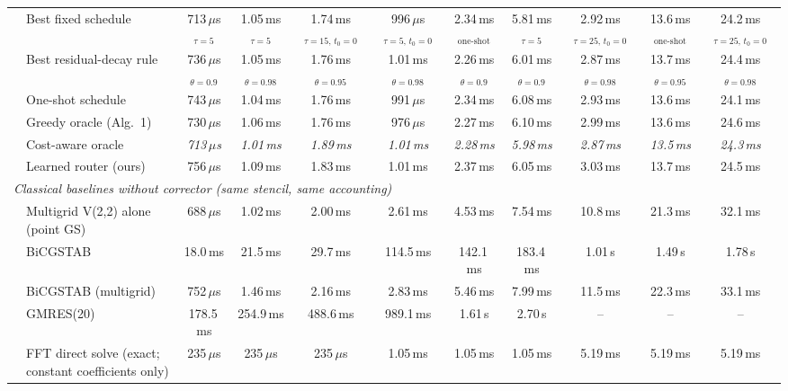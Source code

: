 {\begin{tabular}{llccccccccc}
 & Best fixed schedule & 713\,$\mu$s$_{\tau{=}5}$ & 1.05\,ms$_{\tau{=}5}$ & 1.74\,ms$_{\tau{=}15,\,t_0{=}0}$ & 996\,$\mu$s$_{\tau{=}5,\,t_0{=}0}$ & 2.34\,ms$_{\text{one-shot}}$ & 5.81\,ms$_{\tau{=}5}$ & 2.92\,ms$_{\tau{=}25,\,t_0{=}0}$ & 13.6\,ms$_{\text{one-shot}}$ & 24.2\,ms$_{\tau{=}25,\,t_0{=}0}$ \\
 & Best residual-decay rule & 736\,$\mu$s$_{\theta{=}0.9}$ & 1.05\,ms$_{\theta{=}0.98}$ & 1.76\,ms$_{\theta{=}0.95}$ & 1.01\,ms$_{\theta{=}0.98}$ & 2.26\,ms$_{\theta{=}0.9}$ & 6.01\,ms$_{\theta{=}0.9}$ & 2.87\,ms$_{\theta{=}0.98}$ & 13.7\,ms$_{\theta{=}0.95}$ & 24.4\,ms$_{\theta{=}0.98}$ \\
 & One-shot schedule & 743\,$\mu$s & 1.04\,ms & 1.76\,ms & 991\,$\mu$s & 2.34\,ms & 6.08\,ms & 2.93\,ms & 13.6\,ms & 24.1\,ms \\
 & Greedy oracle (Alg.~1) & 730\,$\mu$s & 1.06\,ms & 1.76\,ms & 976\,$\mu$s & 2.27\,ms & 6.10\,ms & 2.99\,ms & 13.6\,ms & 24.6\,ms \\
 & Cost-aware oracle & \textit{713\,$\mu$s} & \textit{1.01\,ms} & \textit{1.89\,ms} & \textit{1.01\,ms} & \textit{2.28\,ms} & \textit{5.98\,ms} & \textit{2.87\,ms} & \textit{13.5\,ms} & \textit{24.3\,ms} \\
 & Learned router (ours) & 756\,$\mu$s & 1.09\,ms & 1.83\,ms & 1.01\,ms & 2.37\,ms & 6.05\,ms & 3.03\,ms & 13.7\,ms & 24.5\,ms \\
\midrule
\multicolumn{11}{l}{\emph{Classical baselines without corrector (same stencil, same accounting)}} \\ \midrule
 & Multigrid V(2,2) alone (point GS) & 688\,$\mu$s & 1.02\,ms & 2.00\,ms & 2.61\,ms & 4.53\,ms & 7.54\,ms & 10.8\,ms & 21.3\,ms & 32.1\,ms \\
 & BiCGSTAB & 18.0\,ms & 21.5\,ms & 29.7\,ms & 114.5\,ms & 142.1\,ms & 183.4\,ms & 1.01\,s & 1.49\,s & 1.78\,s \\
 & BiCGSTAB (multigrid) & 752\,$\mu$s & 1.46\,ms & 2.16\,ms & 2.83\,ms & 5.46\,ms & 7.99\,ms & 11.5\,ms & 22.3\,ms & 33.1\,ms \\
 & GMRES(20) & 178.5\,ms & 254.9\,ms & 488.6\,ms & 989.1\,ms & 1.61\,s & 2.70\,s & -- & -- & -- \\
 & FFT direct solve (exact; constant coefficients only) & 235\,$\mu$s & 235\,$\mu$s & 235\,$\mu$s & 1.05\,ms & 1.05\,ms & 1.05\,ms & 5.19\,ms & 5.19\,ms & 5.19\,ms \\
\bottomrule
\end{tabular}}
